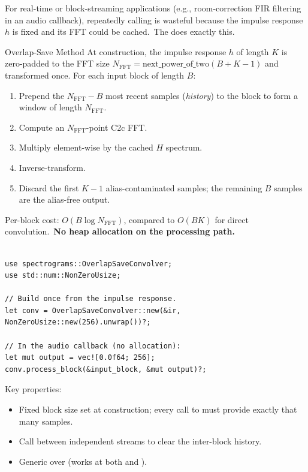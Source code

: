 For real-time or block-streaming applications (e.g., room-correction
FIR filtering in an audio callback), repeatedly calling
 is wasteful because the impulse response $h$
is fixed and its FFT could be cached.\ The
 does exactly this.

\begin{concept}{Overlap-Save Method}
  At construction, the impulse response $h$ of length $K$ is
  zero-padded to the FFT size $N_{\text{FFT}} =
  \text{next\_power\_of\_two}(B + K - 1)$ and transformed once.
  For each input block of length $B$:
  \begin{enumerate}
    \item Prepend the $N_{\text{FFT}} - B$ most recent samples
      (\emph{history}) to the block to form a window of length $N_{\text{FFT}}$.
    \item Compute an $N_{\text{FFT}}$-point C2c FFT.
    \item Multiply element-wise by the cached $H$ spectrum.
    \item Inverse-transform.
    \item Discard the first $K - 1$ alias-contaminated samples; the
      remaining $B$ samples are the alias-free output.
  \end{enumerate}

  Per-block cost: $O(B \log N_{\text{FFT}})$, compared to $O(BK)$ for
  direct convolution.\ \textbf{No heap allocation on the processing path.}
\end{concept}

\begin{lstlisting}[caption={Streaming overlap-save with fixed block size}]

use spectrograms::OverlapSaveConvolver;
use std::num::NonZeroUsize;

// Build once from the impulse response.
let conv = OverlapSaveConvolver::new(&ir, NonZeroUsize::new(256).unwrap())?;

// In the audio callback (no allocation):
let mut output = vec![0.0f64; 256];
conv.process_block(&input_block, &mut output)?;
\end{lstlisting}

Key properties:
\begin{itemize}
  \item Fixed block size set at construction; every call to
     must provide exactly that many samples.
  \item Call  between independent streams to clear the
    inter-block history.
  \item Generic over  (works at both  and
    ).
\end{itemize}

